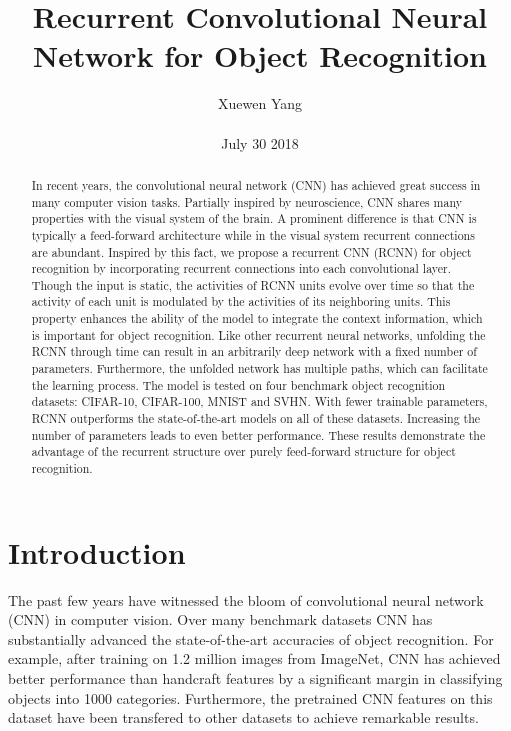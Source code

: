 \documentclass[10pt,twocolumn,letterpaper]{article}
\author{Xuewen Yang\\\\
July 30 2018}
\title{Recurrent Convolutional Neural Network for Object Recognition}
\begin{document}
\maketitle
\begin{abstract}
In recent years, the convolutional neural network (CNN)
has achieved great success in many computer vision tasks.
Partially inspired by neuroscience, CNN shares many properties
with the visual system of the brain. A prominent difference
is that CNN is typically a feed-forward architecture
while in the visual system recurrent connections are abundant.
Inspired by this fact, we propose a recurrent CNN
(RCNN) for object recognition by incorporating recurrent
connections into each convolutional layer. Though the input
is static, the activities of RCNN units evolve over time
so that the activity of each unit is modulated by the activities
of its neighboring units. This property enhances
the ability of the model to integrate the context information,
which is important for object recognition. Like other
recurrent neural networks, unfolding the RCNN through
time can result in an arbitrarily deep network with a fixed
number of parameters. Furthermore, the unfolded network
has multiple paths, which can facilitate the learning process.
The model is tested on four benchmark object recognition
datasets: CIFAR-10, CIFAR-100, MNIST and SVHN.
With fewer trainable parameters, RCNN outperforms the
state-of-the-art models on all of these datasets. Increasing
the number of parameters leads to even better performance.
These results demonstrate the advantage of the recurrent
structure over purely feed-forward structure for object
recognition.
\end{abstract}
\section{Introduction}
The past few years have witnessed the bloom of convolutional neural network (CNN) in computer vision. Over many benchmark datasets CNN has substantially advanced the state-of-the-art accuracies of object recognition\cite{Krizhevsky2012ImageNet}\cite{Chatfield2014Return}\cite{Lin2013Network}. For example, after training on 1.2 million images from ImageNet, CNN has achieved better performance than handcraft features by a significant margin in
classifying objects into 1000 categories. Furthermore, the pretrained CNN features on this dataset have been transfered to other datasets to achieve remarkable results.
\end{document}
